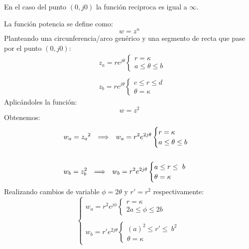 En el caso del punto $(0,j0)$ la función reciproca es igual a $\infty$.

La función potencia se define como:
\begin{equation}
    w=z^n
\end{equation}
Planteando una circunferencia/arco genérico y una segmento de recta que pase por el punto $(0,j0)$:
\begin{equation}
    \begin{aligned}
        &z_a=re^{j\theta}\begin{cases}
            r=\kappa\\
            a\leq\theta\leq b
        \end{cases}\\
        \\
        &z_b=re^{j\theta}\begin{cases}
            c\leq r\leq d\\
            \theta=\kappa
        \end{cases}
    \end{aligned}
\end{equation}
Aplicándoles la función:
\begin{equation}
    w=z^2
\end{equation}
Obtenemos:
\begin{equation}
    \begin{aligned}
        &w_a={z_a}^2\hspace{0.25cm} \Longrightarrow \hspace{0.25cm} w_a=r^2e^{2j\theta}\begin{cases}
            r=\kappa\\
            a\leq\theta\leq b
        \end{cases}\\
        \\
        &w_b=z_b^2\hspace{0.25cm} \Longrightarrow \hspace{0.25cm} w_b=r^2e^{2j\theta}\begin{cases}
            a\leq r\leq\ b\\
            \theta=\kappa
        \end{cases}
    \end{aligned}
\end{equation}
Realizando cambios de variable $\phi=2\theta$ y $r'=r^2$ respectivamente:
\begin{equation}
\begin{cases}
    w_a=r^2e^{j\phi}\begin{cases}
            r=\kappa\\
            2a\leq\phi\leq 2b
        \end{cases}\\
    \\
    w_b=r'e^{2j\theta}\begin{cases}
        (a)^2\leq r'\leq\ b^2\\
        \theta=\kappa
        \end{cases}
\end{cases}
\end{equation}
